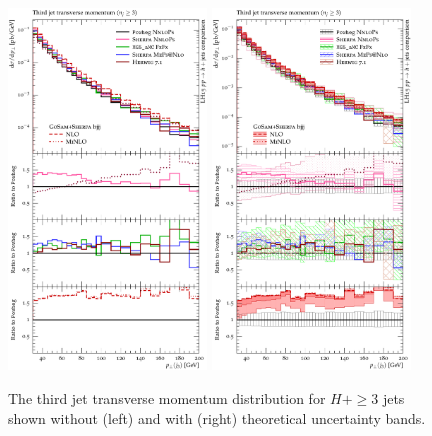 \begin{figure}[t!]
  \centering
  \includegraphics[width=0.47\textwidth]{figures/hjetscomp_u_jet3_pT_incl.pdf}
  \hfill
  \includegraphics[width=0.47\textwidth]{figures/hjetscomp_jet3_pT_incl.pdf}
  \caption{
    The third jet transverse momentum distribution for $H+\ge3$ jets
    shown without (left) and with (right) theoretical uncertainty bands.
    \label{fig:hjetscomp:results:mobs:j3pt}
  }
\end{figure}

